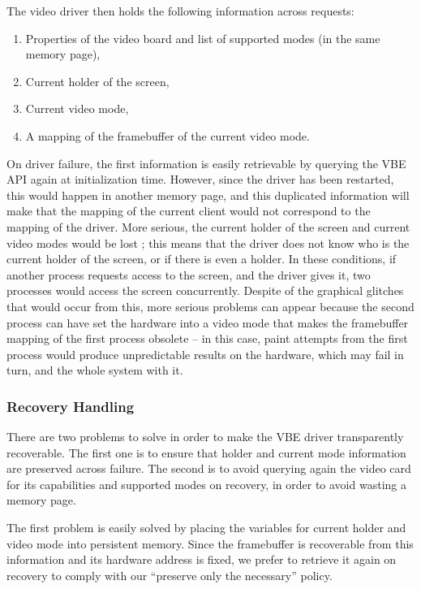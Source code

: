 \documentclass{acm_proc_article-sp}
\begin{document}
The video driver then holds the following information across requests:
\begin{enumerate}
\item Properties of the video board and list of supported modes (in the same memory page),
\item Current holder of the screen,
\item Current video mode,
\item A mapping of the framebuffer of the current video mode.
\end{enumerate}

On driver failure, the first information is easily retrievable by querying the VBE API again at initialization time. However, since the driver has been restarted, this would happen in another memory page, and this duplicated information will make that the mapping of the current client would not correspond to the mapping of the driver. More serious, the current holder of the screen and current video modes would be lost ; this means that the driver does not know who is the current holder of the screen, or if there is even a holder. In these conditions, if another process requests access to the screen, and the driver gives it, two processes would access the screen concurrently. Despite of the graphical glitches that would occur from this, more serious problems can appear because the second process can have set the hardware into a video mode that makes the framebuffer mapping of the first process obsolete -- in this case, paint attempts from the first process would produce unpredictable results on the hardware, which may fail in turn, and the whole system with it.

\subsubsection{Recovery Handling}
There are two problems to solve in order to make the VBE driver transparently recoverable. The first one is to ensure that holder and current mode information are preserved across failure. The second is to avoid querying again the video card for its capabilities and supported modes on recovery, in order to avoid wasting a memory page.

The first problem is easily solved by placing the variables for current holder and video mode into persistent memory. Since the framebuffer is recoverable from this information and its hardware address is fixed, we prefer to retrieve it again on recovery to comply with our ``preserve only the necessary'' policy.
\end{document}
